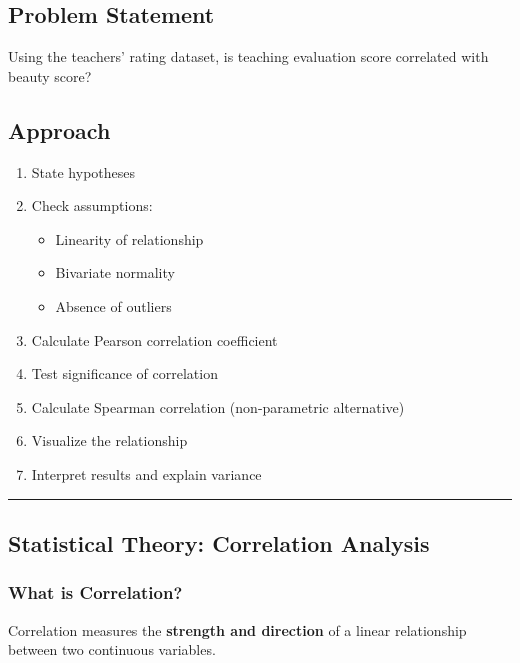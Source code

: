\documentclass[11pt]{article}
\providecommand{\tightlist}{%
      \setlength{\itemsep}{0pt}\setlength{\parskip}{0pt}}
\begin{document}
\subsection{Problem Statement}\label{problem-statement}

Using the teachers' rating dataset, is teaching evaluation score
correlated with beauty score?

\subsection{Approach}\label{approach}

\begin{enumerate}
\def\labelenumi{\arabic{enumi}.}
\tightlist
\item
  State hypotheses
\item
  Check assumptions:

  \begin{itemize}
  \tightlist
  \item
    Linearity of relationship
  \item
    Bivariate normality
  \item
    Absence of outliers
  \end{itemize}
\item
  Calculate Pearson correlation coefficient
\item
  Test significance of correlation
\item
  Calculate Spearman correlation (non-parametric alternative)
\item
  Visualize the relationship
\item
  Interpret results and explain variance
\end{enumerate}

\begin{center}\rule{0.5\linewidth}{0.5pt}\end{center}

    \subsection{Statistical Theory: Correlation
Analysis}\label{statistical-theory-correlation-analysis}

\subsubsection{What is Correlation?}\label{what-is-correlation}

Correlation measures the \textbf{strength and direction} of a linear
relationship between two continuous variables.
\end{document}
